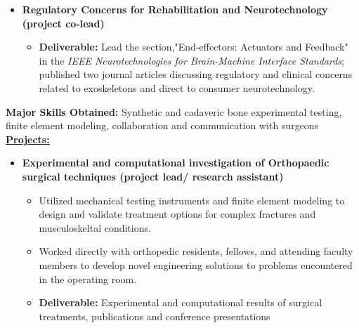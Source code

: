 \begin{adjustwidth}{0.5em}{0pt}
\begin{itemize}
    \item[\color{accent}\ding{224}] {\color{emphasis}\textbf{Regulatory Concerns for Rehabilitation and Neurotechnology (project co-lead) \hspace{10pt}}}\\
    \smallskip
        \begin{itemize}
            \item {\color{pink} \textbf{Deliverable:}} Lead the section,"End-effectors: Actuators and Feedback" in the \textit{IEEE Neurotechnologies for Brain-Machine Interface Standards}; published two journal articles discussing regulatory and clinical concerns related to exoskeletons  and direct to consumer neurotechnology.  
        \end{itemize}    
    \end{itemize}
\end{adjustwidth}

\vspace{-0.5em}
\divider

\smallskip
{\small{\color{skills}\textbf{Major Skills Obtained:}} Synthetic and cadaveric bone experimental testing, finite element modeling, collaboration and communication with surgeons}\\
\smallskip
{\color{accent}\underline{\textbf{Projects:}}}\\
\begin{adjustwidth}{0.5em}{0pt}
    \begin{itemize}
    \item[\color{accent}\ding{224}] {\color{emphasis}\textbf{Experimental and computational investigation of Orthopaedic surgical techniques (project lead/ research assistant)}}\\
    \smallskip
        \begin{itemize}
            \item Utilized mechanical testing instruments and finite element modeling to design and validate treatment options for complex fractures and musculoskeltal conditions.
            \item Worked directly with orthopedic residents, fellows, and attending faculty members to develop novel engineering solutions to problems encountered in the operating room. 
            \item {\color{pink} \textbf{Deliverable:}} Experimental and computational results of surgical treatments, publications and conference presentations
        \end{itemize}
    \end{itemize}
\end{adjustwidth}


